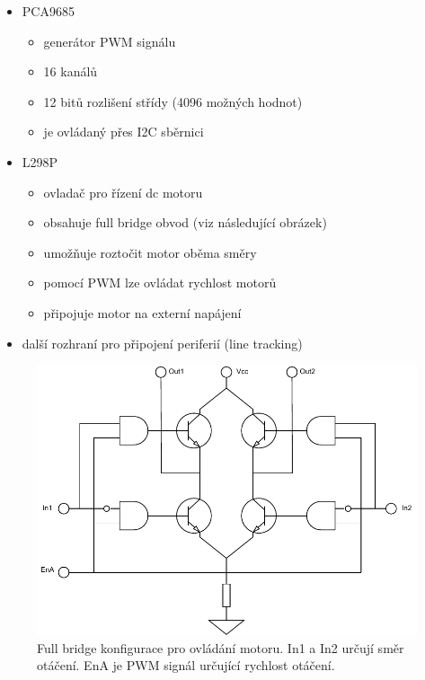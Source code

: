 \begin{itemize}
	\item{PCA9685 \cite{pca9685}}
	\begin{itemize}
		\item{generátor PWM signálu}
		\item{16 kanálů}
		\item{12 bitů rozlišení střídy (4096 možných hodnot)}
		\item{je ovládaný přes I2C sběrnici}
	\end{itemize}
	\item{L298P}
	\begin{itemize}
		\item{ovladač pro řízení dc motoru}
		\item{obsahuje full bridge obvod (viz následující obrázek)}
		\item{umožňuje roztočit motor oběma směry}
		\item{pomocí PWM lze ovládat rychlost motorů}
		\item{připojuje motor na externí napájení}
	\end{itemize}
	\item{další rozhraní pro připojení periferií (line tracking)}
\end{itemize}

\begin{figure}[h!]
	\centering
	\includegraphics[scale=0.75]{obrazky-figures/motor_full_bridge.pdf}
	\caption{Full bridge konfigurace pro ovládání motoru. In1 a In2 určují směr otáčení. EnA je PWM signál určující rychlost otáčení. \cite{l298}}
	\label{}
\end{figure}

